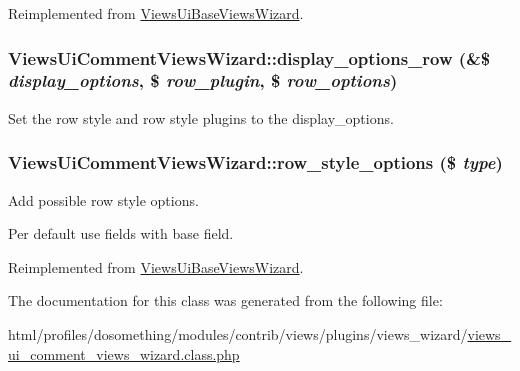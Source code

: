 Reimplemented from \hyperlink{classViewsUiBaseViewsWizard_a862c9e72a5e11fd78baa1992581f1410}{ViewsUiBaseViewsWizard}.\hypertarget{classViewsUiCommentViewsWizard_a60437279b07fc1fce54c3cb2726b1435}{
\subsubsection[{display\_\-options\_\-row}]{\setlength{\rightskip}{0pt plus 5cm}ViewsUiCommentViewsWizard::display\_\-options\_\-row (\&\$ {\em display\_\-options}, \/  \$ {\em row\_\-plugin}, \/  \$ {\em row\_\-options})}}
\label{classViewsUiCommentViewsWizard_a60437279b07fc1fce54c3cb2726b1435}
Set the row style and row style plugins to the display\_\-options. \hypertarget{classViewsUiCommentViewsWizard_a7cf128d60641d6b2e7125b98c4a7dc14}{
\subsubsection[{row\_\-style\_\-options}]{\setlength{\rightskip}{0pt plus 5cm}ViewsUiCommentViewsWizard::row\_\-style\_\-options (\$ {\em type})}}
\label{classViewsUiCommentViewsWizard_a7cf128d60641d6b2e7125b98c4a7dc14}
Add possible row style options.

Per default use fields with base field. 

Reimplemented from \hyperlink{classViewsUiBaseViewsWizard_af5c8d4b868a5bf71075c373af3a96252}{ViewsUiBaseViewsWizard}.

The documentation for this class was generated from the following file:\begin{DoxyCompactItemize}
\item 
html/profiles/dosomething/modules/contrib/views/plugins/views\_\-wizard/\hyperlink{views__ui__comment__views__wizard_8class_8php}{views\_\-ui\_\-comment\_\-views\_\-wizard.class.php}\end{DoxyCompactItemize}
